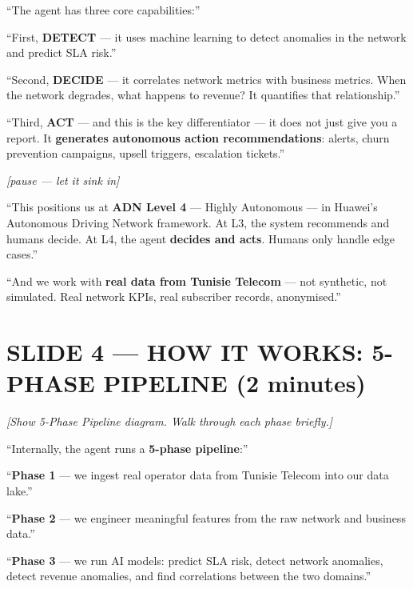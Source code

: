 \documentclass[12pt,a4paper]{article}
\newcommand{\stage}[1]{\par\textit{\color{stagedir}[#1]}\par}
\newcommand{\beat}{\par\vspace{0.4em}}
\newcommand{\pause}{\par\textit{\color{stagedir}[pause --- let it sink
            in]}\par}
\newcommand{\keyword}[1]{\textbf{\color{aiviolet}#1}}
\newcommand{\emphasis}[1]{\textbf{\color{huaweired}#1}}
\begin{document}
\beat

``The agent has three core capabilities:''

\beat

``First, \emphasis{DETECT} --- it uses machine learning to detect anomalies in
the network and predict SLA risk.''

\beat

``Second, \emphasis{DECIDE} --- it correlates network metrics with business
metrics. When the network degrades, what happens to revenue? It quantifies that
relationship.''

\beat

``Third, \emphasis{ACT} --- and this is the key differentiator --- it does not
just give you a report. It \keyword{generates autonomous action
    recommendations}: alerts, churn prevention campaigns, upsell triggers,
escalation tickets.''

\pause

``This positions us at \keyword{ADN Level 4} --- Highly Autonomous --- in
Huawei's Autonomous Driving Network framework. At L3, the system recommends and
humans decide. At L4, the agent \emphasis{decides and acts}. Humans only handle
edge cases.''

\beat

``And we work with \emphasis{real data from Tunisie Telecom} --- not synthetic,
not simulated. Real network KPIs, real subscriber records, anonymised.''

\newpage
\section{SLIDE 4 --- HOW IT WORKS: 5-PHASE PIPELINE (2 minutes)}

\stage{Show 5-Phase Pipeline diagram. Walk through each phase briefly.}

``Internally, the agent runs a \keyword{5-phase pipeline}:''

\beat

``\keyword{Phase 1} --- we ingest real operator data from Tunisie Telecom into
our data lake.''

\beat

``\keyword{Phase 2} --- we engineer meaningful features from the raw network
and business data.''

\beat

``\keyword{Phase 3} --- we run AI models: predict SLA risk, detect network
anomalies, detect revenue anomalies, and find correlations between the two
domains.''
\end{document}
